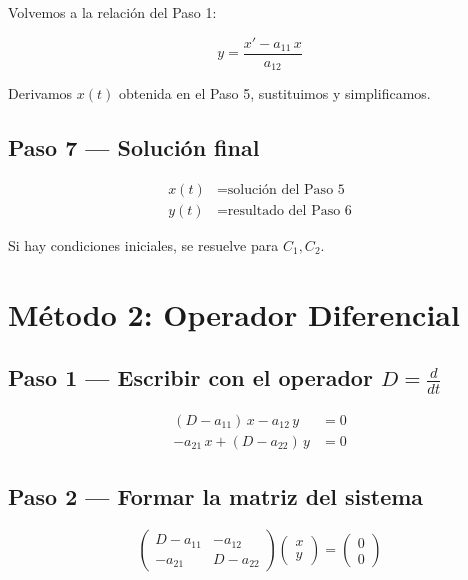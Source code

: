 \documentclass[9pt,a4paper]{article}
\begin{document}
Volvemos a la relación del Paso 1:

\[
y = \frac{x' - a_{11}\,x}{a_{12}}
\]

Derivamos \(x(t)\) obtenida en el Paso 5, sustituimos y simplificamos.

\subsection{Paso 7 --- Solución final}

\[
\boxed{
\begin{aligned}
x(t) &= \text{solución del Paso 5} \\
y(t) &= \text{resultado del Paso 6}
\end{aligned}
}
\]

Si hay condiciones iniciales, se resuelve para \(C_1, C_2\).

\section{Método 2: Operador Diferencial}

\subsection{Paso 1 --- Escribir con el operador \(D = \frac{d}{dt}\)}

\[
\begin{aligned}
(D - a_{11})\,x - a_{12}\,y &= 0 \\
-a_{21}\,x + (D - a_{22})\,y &= 0
\end{aligned}
\]

\subsection{Paso 2 --- Formar la matriz del sistema}

\[
\begin{pmatrix}
D - a_{11} & -a_{12} \\
-a_{21}    & D - a_{22}
\end{pmatrix}
\begin{pmatrix} x \\ y \end{pmatrix}
=
\begin{pmatrix} 0 \\ 0 \end{pmatrix}
\]
\end{document}
